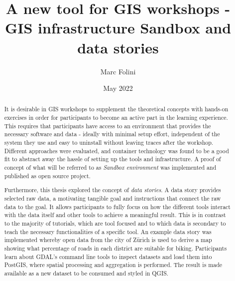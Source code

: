 \documentclass[11pt, a4paper, oneside, parskip=full-]{scrartcl}
\title{A new tool for GIS workshops -\\GIS infrastructure Sandbox and data stories}
\author{Marc Folini}
\date{May 2022}
\begin{document}
\begin{titlepage}
  \setcounter{page}{1}
  \clearpage\maketitle
  \thispagestyle{empty}
  \begin{abstract}
    It is desirable in GIS workshops to supplement the theoretical concepts with
    hands-on exercises in order for participants to become an active part in the
    learning experience. This requires that participants have access to an
    environment that provides the necessary software and data - ideally with
    minimal setup effort, independent of the system they use and easy to
    uninstall without leaving traces after the workshop. Different approaches
    were evaluated, and container technology was found to be a good fit to
    abstract away the hassle of setting up the tools and infrastructure. A proof
    of concept of what will be referred to as \emph{Sandbox environment} was
    implemented and published as open source project.

    Furthermore, this thesis explored the concept of \emph{data stories}. A data
    story provides selected raw data, a motivating tangible goal and
    instructions that connect the raw data to the goal. It allows participants
    to fully focus on how the different tools interact with the data itself and
    other tools to achieve a meaningful result. This is in contrast to the
    majority of tutorials, which are tool focused and to which data is secondary
    to teach the necessary functionalities of a specific tool. An example data
    story was implemented whereby open data from the city of Zürich is used to
    derive a map showing what percentage of roads in each district are suitable
    for biking. Participants learn about GDAL's command line tools to inspect
    datasets and load them into PostGIS\cite{postgis}, where spatial processing
    and aggregation is performed. The result is made available as a new dataset
    to be consumed and styled in QGIS\cite{qgis}.
  \end{abstract}
\end{titlepage}

\newpage
\tableofcontents

\newpage
{}
\setcounter{page}{1}
\end{document}
